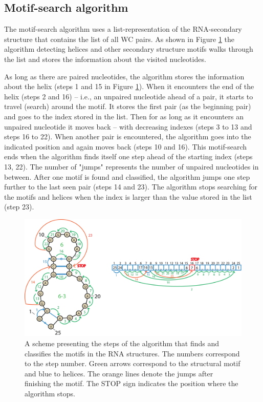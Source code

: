 \documentclass[12pt]{article}
\begin{document}
\subsection{Motif-search algorithm}
The motif-search algorithm uses a list-representation of the RNA-secondary structure that contains the list of all WC pairs. As shown in Figure \ref{MotifsAlgorithm} the algorithm detecting helices and other secondary structure motifs walks through the list and stores the information about the visited nucleotides. 

As long as there are paired nucleotides, the algorithm stores the information about the helix (steps 1 and 15 in Figure \ref{MotifsAlgorithm}). When it encounters the end of the helix (steps 2 and 16) -- i.e., an unpaired nucleotide ahead of a pair, it starts to travel (search) around the motif. It stores the first pair (as the beginning pair) and goes to the index stored in the list. Then for as long as it encounters an unpaired nucleotide it moves back -- with decreasing indexes (steps 3 to 13 and steps 16 to 22). When another pair is encountered, the algorithm goes into the indicated position and again moves back (steps 10 and 16). This motif-search ends when the algorithm finds itself one step ahead of the starting index (steps 13, 22). The number of "jumps" represents the number of unpaired nucleotides in between. After one motif is found and classified, the algorithm jumps one step further to the last seen pair (steps 14 and 23). The algorithm stops searching for the motifs and helices when the index is larger than the value stored in the list (step 23). 

\begin{figure}[h!]
\centering
\includegraphics[width =\textwidth]{./pictures/algorithm.png}
\caption{A scheme presenting the steps of the algorithm that finds and classifies the motifs in the RNA structures. The numbers correspond to the step number. Green arrows correspond to the structural motif and blue to  helices. The orange lines denote the jumps after finishing the motif. The STOP sign indicates the position where the algorithm stops.}
\label{MotifsAlgorithm}
\end{figure}
\end{document}

